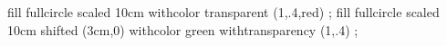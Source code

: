 \startMPpage
    fill fullcircle scaled 10cm                 withcolor transparent (1,.4,red) ;
    fill fullcircle scaled 10cm shifted (3cm,0) withcolor green withtransparency (1,.4) ;
\stopMPpage

